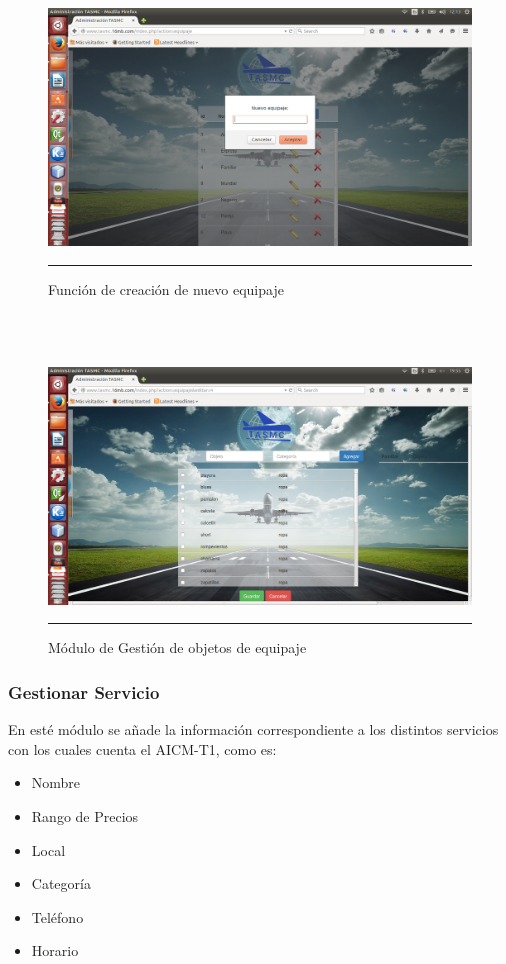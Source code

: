 \\
\\
\begin{figure}[h!]
	\centering
		\includegraphics[width=1\textwidth]{Figuras/nuevoequipajewb.png}
		\rule{35em}{0.5pt}
	\caption[Función de creación de nuevo equipaje]{Función de creación de nuevo equipaje}
	\label{fig:funcionNuevoEquipaje}
\end{figure}
\\
\\
\begin{figure}[h!]
	\centering
		\includegraphics[width=1\textwidth]{Figuras/objetosEquipaje.png}
		\rule{35em}{0.5pt}
	\caption[Módulo de Gestión de objetos de equipaje]{Módulo de Gestión de objetos de equipaje}
	\label{fig:moduloObjetos}
\end{figure}
\clearpage

\subsubsection{Gestionar Servicio}
En esté módulo se añade la información correspondiente a los distintos servicios con los cuales cuenta el AICM-T1, como es: 
\begin{itemize}
 \item Nombre
 \item Rango de Precios
 \item Local
 \item Categoría
 \item Teléfono
 \item Horario
\end{itemize}


